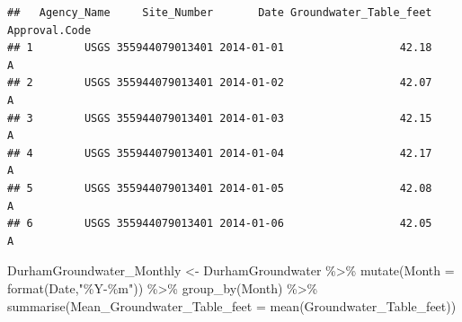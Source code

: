 \documentclass[
  12pt,
]{article}
\newenvironment{Shaded}{\begin{snugshade}}{\end{snugshade}}
\newcommand{\AttributeTok}[1]{\textcolor[rgb]{0.77,0.63,0.00}{#1}}
\newcommand{\FunctionTok}[1]{\textcolor[rgb]{0.00,0.00,0.00}{#1}}
\newcommand{\NormalTok}[1]{#1}
\newcommand{\OtherTok}[1]{\textcolor[rgb]{0.56,0.35,0.01}{#1}}
\newcommand{\SpecialCharTok}[1]{\textcolor[rgb]{0.00,0.00,0.00}{#1}}
\newcommand{\StringTok}[1]{\textcolor[rgb]{0.31,0.60,0.02}{#1}}
\begin{document}
\begin{verbatim}
##   Agency_Name     Site_Number       Date Groundwater_Table_feet Approval.Code
## 1        USGS 355944079013401 2014-01-01                  42.18             A
## 2        USGS 355944079013401 2014-01-02                  42.07             A
## 3        USGS 355944079013401 2014-01-03                  42.15             A
## 4        USGS 355944079013401 2014-01-04                  42.17             A
## 5        USGS 355944079013401 2014-01-05                  42.08             A
## 6        USGS 355944079013401 2014-01-06                  42.05             A
\end{verbatim}

\begin{Shaded}
\begin{Highlighting}[]
\NormalTok{DurhamGroundwater\_Monthly }\OtherTok{\textless{}{-}}\NormalTok{ DurhamGroundwater }\SpecialCharTok{\%\textgreater{}\%}
  \FunctionTok{mutate}\NormalTok{(}\AttributeTok{Month =} \FunctionTok{format}\NormalTok{(Date,}\StringTok{"\%Y{-}\%m"}\NormalTok{)) }\SpecialCharTok{\%\textgreater{}\%}
  \FunctionTok{group\_by}\NormalTok{(Month) }\SpecialCharTok{\%\textgreater{}\%}
  \FunctionTok{summarise}\NormalTok{(}\AttributeTok{Mean\_Groundwater\_Table\_feet =} \FunctionTok{mean}\NormalTok{(Groundwater\_Table\_feet))}
\end{Highlighting}
\end{Shaded}
\end{document}
